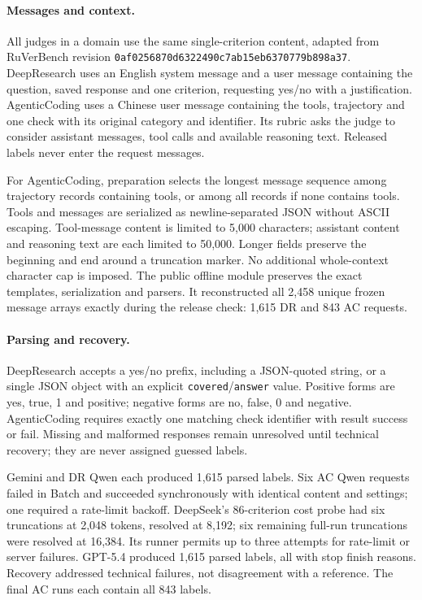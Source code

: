 \paragraph{Messages and context.}
All judges in a domain use the same single-criterion content, adapted from
RuVerBench revision \texttt{0af0256870d6322490c7ab15eb6370779b898a37}.
DeepResearch uses an English system message and a user message containing the
question, saved response and one criterion, requesting yes/no with a
justification. AgenticCoding uses a Chinese user message containing the tools,
trajectory and one check with its original category and identifier. Its rubric
asks the judge to consider assistant messages, tool calls and available
reasoning text. Released labels never enter the request messages.

For AgenticCoding, preparation selects the longest message sequence among
trajectory records containing tools, or among all records if none contains
tools. Tools and messages are serialized as newline-separated JSON without
ASCII escaping. Tool-message content is limited to 5,000 characters; assistant
content and reasoning text are each limited to 50,000. Longer fields preserve
the beginning and end around a truncation marker. No additional whole-context
character cap is imposed. The public offline module
 preserves the exact templates,
serialization and parsers. It reconstructed all 2,458 unique frozen message
arrays exactly during the release check: 1,615 DR and 843 AC requests.

\paragraph{Parsing and recovery.}
DeepResearch accepts a yes/no prefix, including a JSON-quoted string, or a
single JSON object with an explicit \texttt{covered}/\texttt{answer} value.
Positive forms are yes, true, 1 and positive; negative forms are no, false, 0
and negative. AgenticCoding requires exactly one matching check identifier
with result success or fail. Missing and malformed responses remain unresolved
until technical recovery; they are never assigned guessed labels.

Gemini and DR Qwen each produced 1,615 parsed labels. Six AC Qwen requests
failed in Batch and succeeded synchronously with identical content and
settings; one required a rate-limit backoff. DeepSeek's 86-criterion cost probe
had six truncations at 2,048 tokens, resolved at 8,192; six remaining
full-run truncations were resolved at 16,384. Its runner permits up to three
attempts for rate-limit or server failures. GPT-5.4 produced 1,615 parsed
labels, all with stop finish reasons. Recovery addressed technical failures,
not disagreement with a reference. The final AC runs each contain all 843
labels.

